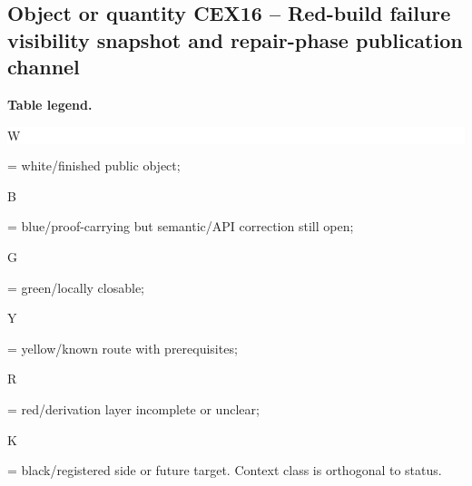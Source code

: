 \subsection*{Object or quantity CEX16 -- Red-build failure visibility snapshot and repair-phase publication channel}
\hypertarget{objproof:CEX16}{}
\par\smallskip\noindent\begin{minipage}{0.99\linewidth}\footnotesize\raggedright\textbf{Table legend.} \colorbox{white}{\strut W} = white/finished public object; \colorbox{cyan!20}{\strut B} = blue/proof-carrying but semantic/API correction still open; \colorbox{green!18}{\strut G} = green/locally closable; \colorbox{yellow!25}{\strut Y} = yellow/known route with prerequisites; \colorbox{red!20}{\strut R} = red/derivation layer incomplete or unclear; \colorbox{black!18}{\strut K} = black/registered side or future target. Context class is orthogonal to status.\end{minipage}\par\vspace{0.25em}
